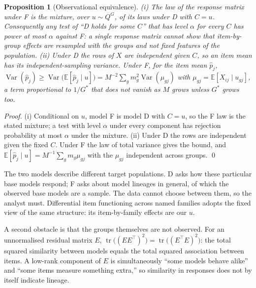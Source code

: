 \documentclass[10pt]{article}
\newtheorem{proposition}{Proposition}
\theoremstyle{remark}\newtheorem{remark}{Remark}
\DeclareMathOperator{\Var}{Var}
\DeclareMathOperator{\tr}{tr}
\begin{document}
\begin{proposition}[Observational equivalence]\label{prop:equiv}
(i) The law of the response matrix under F is the mixture, over $u\sim Q^{G}$,
of its laws under D with $C=u$. Consequently any test of ``D holds for some
$C$'' that has level $\alpha$ for every $C$ has power at most $\alpha$ against
F: a single response matrix cannot show that item-by-group effects are
resampled with the groups and not fixed features of the population.
(ii) Under D the rows of $X$ are independent given $C$, so an item mean has
its independent-sampling variance. Under F, for the item mean $\hat p_j$,
$\Var(\hat p_j)\ge\Var\big(\mathbb E[\hat p_j\mid u]\big)
=M^{-2}\sum_g m_g^2\Var(\mu_{gj})$ with
$\mu_{gj}=\mathbb E[X_{ij}\mid u_{gj}]$, a term proportional to $1/G^\ast$
that does not vanish as $M$ grows unless $G^\ast$ grows too.
\end{proposition}
\noindent\emph{Proof.} (i) Conditional on $u$, model F is model D with $C=u$,
so the F law is the stated mixture; a test with level $\alpha$ under every
component has rejection probability at most $\alpha$ under the mixture.
(ii) Under D the rows are independent given the fixed $C$. Under F the law of
total variance gives the bound, and
$\mathbb E[\hat p_j\mid u]=M^{-1}\sum_g m_g\mu_{gj}$ with the $\mu_{gj}$
independent across groups. \qed

The two models describe different target populations. D asks how these
particular base models respond; F asks about model lineages in general, of
which the observed base models are a sample. The data cannot choose between
them, so the analyst must. Differential item functioning across named
families \citep{dif2026llm,neartied2026rankings} adopts the fixed view of the
same structure: its item-by-family effects are our $u$.

A second obstacle is that the groups themselves are not observed. For an
unnormalised residual matrix $E$,
$\tr\big((EE^\top)^2\big)=\tr\big((E^\top E)^2\big)$: the total squared
similarity between models equals the total squared association between items.
A low-rank component of $E$ is simultaneously ``some models behave alike'' and
``some items measure something extra,'' so similarity in responses does not by
itself indicate lineage.
\end{document}
